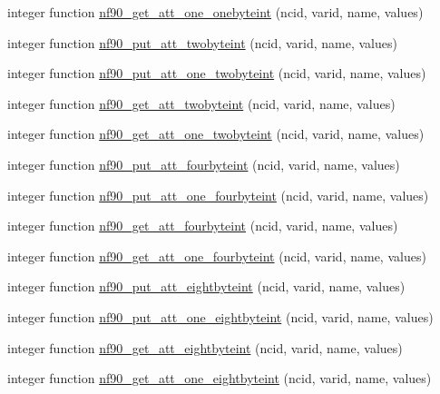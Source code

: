 \begin{DoxyCompactItemize}
\item 
integer function \hyperlink{netcdf__attributes_8f90_a81fc65e13ec42b59e050c620e7987275}{nf90\+\_\+get\+\_\+att\+\_\+one\+\_\+onebyteint} (ncid, varid, name, values)
\item 
integer function \hyperlink{netcdf__attributes_8f90_a784122c3e1ef96565740ef2f337aef63}{nf90\+\_\+put\+\_\+att\+\_\+twobyteint} (ncid, varid, name, values)
\item 
integer function \hyperlink{netcdf__attributes_8f90_af4bdea237855ce319a9f0dca1359d2dd}{nf90\+\_\+put\+\_\+att\+\_\+one\+\_\+twobyteint} (ncid, varid, name, values)
\item 
integer function \hyperlink{netcdf__attributes_8f90_a46f84b604d2ff5dcaaf504748d700658}{nf90\+\_\+get\+\_\+att\+\_\+twobyteint} (ncid, varid, name, values)
\item 
integer function \hyperlink{netcdf__attributes_8f90_aa56b215c5412ae5544a3f87fd90a3db7}{nf90\+\_\+get\+\_\+att\+\_\+one\+\_\+twobyteint} (ncid, varid, name, values)
\item 
integer function \hyperlink{netcdf__attributes_8f90_ab67d5496dc028bad90a8b3e56c1f40d2}{nf90\+\_\+put\+\_\+att\+\_\+fourbyteint} (ncid, varid, name, values)
\item 
integer function \hyperlink{netcdf__attributes_8f90_ad7b0acbaf6fa3759dfa83e4f473bde8b}{nf90\+\_\+put\+\_\+att\+\_\+one\+\_\+fourbyteint} (ncid, varid, name, values)
\item 
integer function \hyperlink{netcdf__attributes_8f90_a4e3a573aadb247068a8ece7d28cdc929}{nf90\+\_\+get\+\_\+att\+\_\+fourbyteint} (ncid, varid, name, values)
\item 
integer function \hyperlink{netcdf__attributes_8f90_a7e77199a9f60a1292d57185893fcc5e8}{nf90\+\_\+get\+\_\+att\+\_\+one\+\_\+fourbyteint} (ncid, varid, name, values)
\item 
integer function \hyperlink{netcdf__attributes_8f90_a8699be7b4a2527c55488c381333f828c}{nf90\+\_\+put\+\_\+att\+\_\+eightbyteint} (ncid, varid, name, values)
\item 
integer function \hyperlink{netcdf__attributes_8f90_a9e5f3db46f366edbe06f37c07778581f}{nf90\+\_\+put\+\_\+att\+\_\+one\+\_\+eightbyteint} (ncid, varid, name, values)
\item 
integer function \hyperlink{netcdf__attributes_8f90_a598f57d833a84635e8d676911113bfff}{nf90\+\_\+get\+\_\+att\+\_\+eightbyteint} (ncid, varid, name, values)
\item 
integer function \hyperlink{netcdf__attributes_8f90_aa177a6c54e32eb56f8bee42bb9913d16}{nf90\+\_\+get\+\_\+att\+\_\+one\+\_\+eightbyteint} (ncid, varid, name, values)

\end{DoxyCompactItemize}
